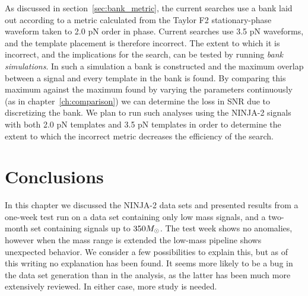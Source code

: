 As discussed in section~\ref{sec:bank_metric}, the current searches
use a bank laid out according to a metric calculated from the Taylor
F2 stationary-phase waveform taken to 2.0 pN order in phase.  Current
searches use 3.5 pN waveforms, and the template placement is therefore
incorrect.  The extent to which it is incorrect, and the implications
for the search, can be tested by running \emph{bank simulations}.  In
such a simulation a bank is constructed and the maximum overlap
between a signal and every template in the bank is found.  By
comparing this maximum against the maximum found by varying the
parameters continuously (as in chapter~\ref{ch:comparison}) we can
determine the loss in SNR due to discretizing  the bank.  We plan to
run such analyses using the NINJA-2 signals with both 2.0 pN templates
and 3.5 pN templates in order to determine the extent to which the
incorrect metric decreases the efficiency of the search.

\section{Conclusions}

In this chapter we discussed the NINJA-2 data sets and presented
results from a one-week test run on a data set containing only low
mass signals, and a two-month set containing signals up to $350
M_\odot$.  The test week shows no anomalies, however when the mass range
is extended the low-mass pipeline shows unexpected behavior.  We
consider a few possibilities to explain this, but as of this writing
no explanation has been found.  It seems more likely to be a bug in
the data set generation than in the analysis, as the latter has been
much more extensively reviewed.  In either case, more study is needed.


